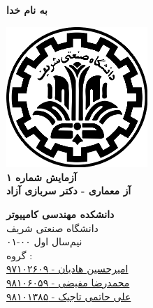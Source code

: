 \documentclass{article}
\begin{document}
\begin{titlepage}
	\begin{center}
		\textbf{ \Huge{به نام خدا}}
	
		\vspace{0.2cm}
	
		\includegraphics[width=0.4\textwidth]{sharif.png}\\
		\vspace{0.2cm}
		\textbf{ \Huge{آزمایش شماره ۱}}\\
		\vspace{0.25cm}
		\textbf{ \Large{آز معماری - دکتر سربازی آزاد}}
		\vspace{0.2cm}
		
		
		\large \textbf{دانشکده مهندسی کامپیوتر}\\\vspace{0.1cm}
		\large   دانشگاه صنعتی شریف\\\vspace{0.2cm}
		\large   ﻧﯿﻢ‌سال اول ۰۰-۰۱ \\\vspace{0.10cm}
		\large{گروه :}\\
		\large{\href{mailto:a.h.hadian@gmail.com}{امیرحسین هادیان - ۹۷۱۰۲۶۰۹}}\\
		\large{\href{mailto:mofayezi.m@gmail.com}{محمدرضا مفیضی - ۹۸۱۰۶۰۵۹}}\\
		\large{\href{mailto:a.hatam008@gmail.com}{علی حاتمی تاجیک - ۹۸۱۰۱۳۸۵}}\\
	\end{center}
\end{titlepage}

\newpage

\pagestyle{fancy}
\fancyhf{}
\fancyfoot{}
\setlength{\headheight}{59pt}
\cfoot{\thepage}
\end{document}
